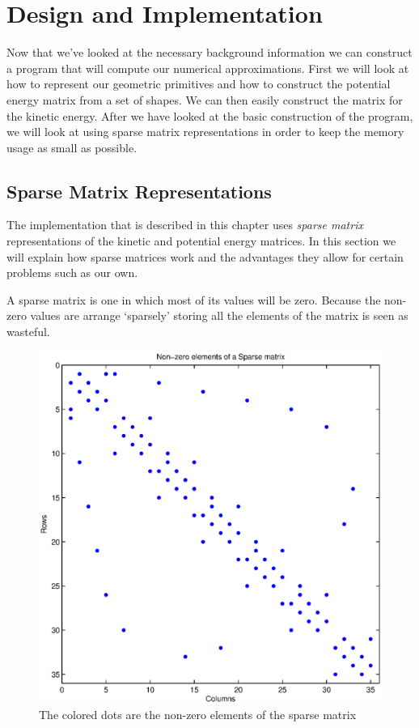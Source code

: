\documentclass[authoryearcitations]{UoYCSproject}
\begin{document}
\chapter{Design and Implementation}
Now that we've looked at the necessary background information we can construct a program that will 
compute our numerical approximations. First we will look at how to represent our geometric primitives 
and how to construct the potential energy matrix from a set of shapes. We can then easily construct
the matrix for the kinetic energy. After we have looked at the basic construction of the program, we 
will look at using sparse matrix representations in order to keep the memory usage as small as possible.

\section{Sparse Matrix Representations}
The implementation that is described in this chapter uses \emph{sparse matrix} representations of the
kinetic and potential energy matrices. In this section we will explain how sparse matrices work and the advantages
they allow for certain problems such as our own. 

A sparse matrix is one in which most of its values will be zero. Because the non-zero values are arrange `sparsely'
storing all the elements of the matrix is seen as wasteful. 

\begin{figure}
\centering
\includegraphics[scale=0.5]{figures/sparseVisual.eps}
\caption{The colored dots are the non-zero elements of the sparse matrix}
\label{sparseExample}
\end{figure}
\end{document}
